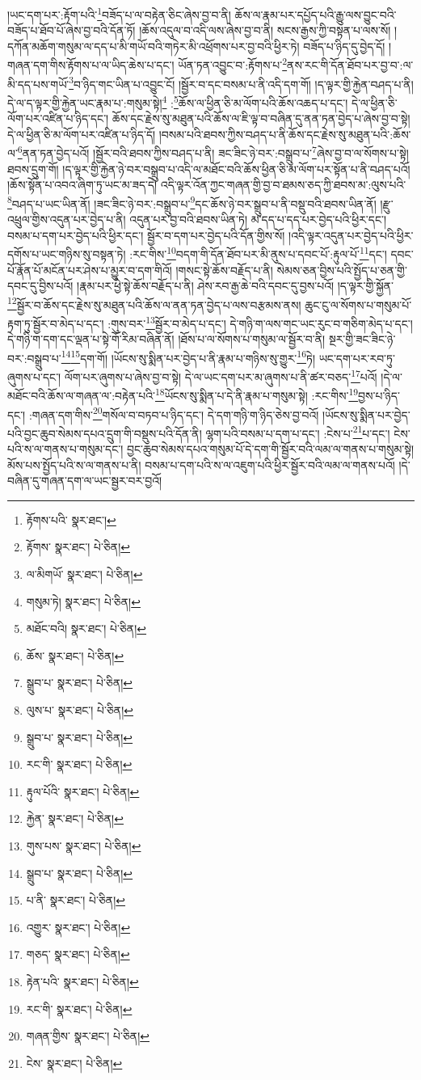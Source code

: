 །ཡང་དག་པར་:རྟོག་པའི་\footnote{རྟོགས་པའི་  སྣར་ཐང་། }བཟོད་པ་ལ་བརྟེན་ཅིང་ཞེས་བྱ་བ་ནི། ཆོས་ལ་རྣམ་པར་དཔྱོད་པའི་རྒྱུ་ལས་བྱུང་བའི་བཟོད་པ་ཐོབ་པོ་ཞེས་བྱ་བའི་དོན་ཏོ། །ཆོས་འདུལ་བ་འདི་ལས་ཞེས་བྱ་བ་ནི། སངས་རྒྱས་ཀྱི་བསྟན་པ་ལས་སོ། །དཀོན་མཆོག་གསུམ་ལ་དད་པ་མི་གཡོ་བའི་གཏེར་མི་འཕྲོགས་པར་བྱ་བའི་ཕྱིར་ཏེ། བཟོད་པ་ཉིད་དུ་བྱེད་དོ། །གཞན་དག་གིས་རྟོགས་པ་ལ་ཡིད་ཆེས་པ་དང་། ཡོན་ཏན་འབྱུང་བ་:རྟོགས་པ་\footnote{རྟོགས་  སྣར་ཐང་།  པེ་ཅིན། }ནས་རང་གི་དོན་ཐོབ་པར་བྱ་བ་:ལ་མི་དད་པས་གཡོ་\footnote{ལ་མིགཡོ་  སྣར་ཐང་།  པེ་ཅིན། }བ་ཉིད་གང་ཡིན་པ་འབྱུང་ངོ། །སྦྱོར་བ་དང་བསམ་པ་ནི་འདི་དག་གོ། །ད་ལྟར་གྱི་རྐྱེན་བཤད་པ་ནི། དེ་ལ་ད་ལྟར་གྱི་རྐྱེན་ཡང་རྣམ་པ་:གསུམ་སྟེ།\footnote{གསུམ་ཏེ།  སྣར་ཐང་།  པེ་ཅིན། } :\footnote{མཐོང་བའི།   སྣར་ཐང་།  པེ་ཅིན། }ཆོས་ལ་ཕྱིན་ཅི་མ་ལོག་པའི་ཆོས་འཆད་པ་དང་། དེ་ལ་ཕྱིན་ཅི་ལོག་པར་འཛིན་པ་ཉིད་དང་། ཆོས་དང་རྗེས་སུ་མཐུན་པའི་ཆོས་ལ་ཇི་ལྟ་བ་བཞིན་དུ་ནན་ཏན་བྱེད་པ་ཞེས་བྱ་བ་སྟེ། དེ་ལ་ཕྱིན་ཅི་མ་ལོག་པར་འཛིན་པ་ཉིད་དོ། །བསམ་པའི་ཐབས་ཀྱིས་བཤད་པ་ནི་ཆོས་དང་རྗེས་སུ་མཐུན་པའི་:ཆོས་ལ་\footnote{ཆོས་  སྣར་ཐང་།  པེ་ཅིན། }ནན་ཏན་བྱེད་པའོ། །སྦྱོར་བའི་ཐབས་ཀྱིས་བཤད་པ་ནི། ཟང་ཟིང་ཉེ་བར་:བསྒྲུབ་པ་\footnote{སྒྲུབ་པ་  སྣར་ཐང་།  པེ་ཅིན། }ཞེས་བྱ་བ་ལ་སོགས་པ་སྟེ། ཐབས་དྲུག་གོ། །ད་ལྟར་གྱི་རྐྱེན་ཉེ་བར་བསྒྲུབ་པ་འདི་ལ་མཐོང་བའི་ཆོས་ཕྱིན་ཅི་མ་ལོག་པར་སྟོན་པ་ནི་བཤད་པའོ། །ཆོས་སྟོན་པ་འབའ་ཞིག་ཏུ་ཡང་མ་ཟད་དེ། འདི་ལྟར་འོན་ཀྱང་གཞན་གྱི་བྱ་བ་ཐམས་ཅད་ཀྱི་ཐབས་མ་:ལུས་པའི་\footnote{ལུས་པ་  སྣར་ཐང་།  པེ་ཅིན། }བཤད་པ་ཡང་ཡིན་ནོ། །ཟང་ཟིང་ཉེ་བར་:བསྒྲུབ་པ་\footnote{སྒྲུབ་པ་  སྣར་ཐང་།  པེ་ཅིན། }དང་ཆོས་ཉེ་བར་སྒྲུབ་པ་ནི་བསྡུ་བའི་ཐབས་ཡིན་ནོ། །རྫུ་འཕྲུལ་གྱིས་འདུན་པར་བྱེད་པ་ནི། འདུན་པར་བྱ་བའི་ཐབས་ཡིན་ཏེ། མ་དད་པ་དད་པར་བྱེད་པའི་ཕྱིར་དང་། བསམ་པ་དག་པར་བྱེད་པའི་ཕྱིར་དང་། སྦྱོར་བ་དག་པར་བྱེད་པའི་དོན་གྱིས་སོ། །འདི་ལྟར་འདུན་པར་བྱེད་པའི་ཕྱིར་དགོས་པ་ཡང་གཉིས་སུ་བསྟན་ཏེ། :རང་གིས་\footnote{རང་གི་  སྣར་ཐང་།  པེ་ཅིན། }བདག་གི་དོན་ཐོབ་པར་མི་ནུས་པ་དབང་པོ་:རྟུལ་པོ་\footnote{རྟུལ་པོའི་  སྣར་ཐང་།  པེ་ཅིན། }དང་། དབང་པོ་རྣོན་པོ་མངོན་པར་ཤེས་པ་མྱུར་བ་དག་གིའོ། །གསང་སྟེ་ཆོས་བརྗོད་པ་ནི། སེམས་ཅན་བྱིས་པའི་སྤྱོད་པ་ཅན་གྱི་དབང་དུ་བྱིས་པའོ། །རྣམ་པར་ཕྱེ་སྟེ་ཆོས་བརྗོད་པ་ནི། ཤེས་རབ་རྒྱ་ཆེ་བའི་དབང་དུ་བྱས་པའོ། །ད་ལྟར་གྱི་སྐྱོན་\footnote{རྐྱེན་  སྣར་ཐང་།  པེ་ཅིན། }སྦྱོར་བ་ཆོས་དང་རྗེས་སུ་མཐུན་པའི་ཆོས་ལ་ནན་ཏན་བྱེད་པ་ལས་བརྩམས་ནས། ཆུང་ངུ་ལ་སོགས་པ་གསུམ་པོ་རྟག་ཏུ་སྦྱོར་བ་མེད་པ་དང་། :གུས་བར་\footnote{གུས་པས་  སྣར་ཐང་།  པེ་ཅིན། }སྦྱོར་བ་མེད་པ་དང་། དེ་གཉི་ག་ལས་གང་ཡང་རུང་བ་གཅིག་མེད་པ་དང་། དེ་གཉི་ག་དག་དང་ལྡན་པ་སྟེ་གོ་རིམ་བཞིན་ནོ། །ཐོས་པ་ལ་སོགས་པ་གསུམ་ལ་སྦྱོར་བ་ནི། སྔར་གྱི་ཟང་ཟིང་ཉེ་བར་:བསྒྲུབ་པ་\footnote{སྒྲུབ་པ་  སྣར་ཐང་།  པེ་ཅིན། }\footnote{པ་ནི་  སྣར་ཐང་།  པེ་ཅིན། }དག་གོ། །ཡོངས་སུ་སྨིན་པར་བྱེད་པ་ནི་རྣམ་པ་གཉིས་སུ་གྱུར་\footnote{འགྱུར་  སྣར་ཐང་།  པེ་ཅིན། }ཏེ། ཡང་དག་པར་རབ་ཏུ་ཞུགས་པ་དང་། ལོག་པར་ཞུགས་པ་ཞེས་བྱ་བ་སྟེ། དེ་ལ་ཡང་དག་པར་མ་ཞུགས་པ་ནི་ཚར་བཅད་\footnote{གཅད་  སྣར་ཐང་།  པེ་ཅིན། }པའོ། །དེ་ལ་མཐོང་བའི་ཆོས་ལ་གཞན་ལ་:བརྟེན་པའི་\footnote{རྟེན་པའི་  སྣར་ཐང་།  པེ་ཅིན། }ཡོངས་སུ་སྨིན་པ་དེ་ནི་རྣམ་པ་གསུམ་སྟེ། :རང་གིས་\footnote{རང་གི་  སྣར་ཐང་།  པེ་ཅིན། }བྱས་པ་ཉིད་དང་། :གཞན་དག་གིས་\footnote{གཞན་གྱིས་  སྣར་ཐང་།  པེ་ཅིན། }གསོལ་བ་བཏབ་པ་ཉིད་དང་། དེ་དག་གཉི་ག་ཉིད་ཅེས་བྱ་བའོ། །ཡོངས་སུ་སྨིན་པར་བྱེད་པའི་བྱང་ཆུབ་སེམས་དཔའ་དྲུག་གི་བསྡུས་པའི་དོན་ནི། ལྷག་པའི་བསམ་པ་དག་པ་དང་། :ངེས་པ་\footnote{ངེས་  སྣར་ཐང་།  པེ་ཅིན། }པ་དང་། ངེས་པའི་ས་ལ་གནས་པ་གསུམ་དང་། བྱང་ཆུབ་སེམས་དཔའ་གསུམ་པོ་དེ་དག་གི་སྦྱོར་བའི་ལམ་ལ་གནས་པ་གསུམ་སྟེ། མོས་པས་སྤྱོད་པའི་ས་ལ་གནས་པ་ནི། བསམ་པ་དག་པའི་ས་ལ་འཇུག་པའི་ཕྱིར་སྦྱོར་བའི་ལམ་ལ་གནས་པའོ། །དེ་བཞིན་དུ་གཞན་དག་ལ་ཡང་སྦྱར་བར་བྱའོ། 